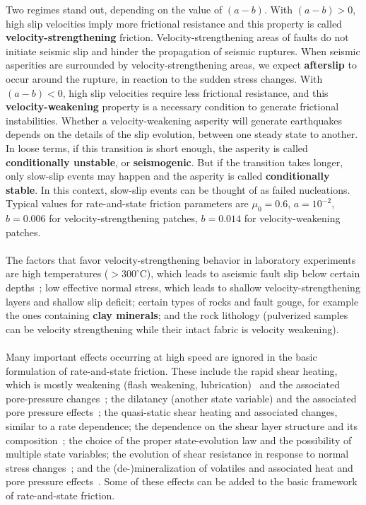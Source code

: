 \documentclass[letterpaper,12pt,]{memoir}
\begin{document}
Two regimes stand out, depending on the value of $(a-b)$. With $(a-b)>0$, high slip velocities imply more frictional resistance and this property is called \textbf{velocity-strengthening} friction. Velocity-strengthening areas of faults do not initiate seismic slip and hinder the propagation of seismic ruptures. When seismic asperities are surrounded by velocity-strengthening areas, we expect \textbf{afterslip} to occur around the rupture, in reaction to the sudden stress changes. With $(a-b)<0$, high slip velocities require less frictional resistance, and this \textbf{velocity-weakening} property is a necessary condition to generate frictional instabilities. Whether a velocity-weakening asperity will generate earthquakes depends on the details of the slip evolution, between one steady state to another. In loose terms, if this transition is short enough, the asperity is called \textbf{conditionally unstable}, or \textbf{seismogenic}. But if the transition takes longer, only slow-slip events may happen and the asperity is called \textbf{conditionally stable}. In this context, slow-slip events can be thought of as failed nucleations. Typical values for rate-and-state friction parameters are $\mu_0=0.6$, $a=10^{-2}$, $b=0.006$ for velocity-strengthening patches, $b=0.014$ for velocity-weakening patches.\\
\\
The factors that favor velocity-strengthening behavior in laboratory experiments are high temperatures ($>300^\circ$C), which leads to aseismic fault slip below certain depths~\citep{tse&rice86}; low effective normal stress, which leads to shallow velocity-strengthening layers and shallow slip deficit; certain types of rocks and fault gouge, for example the ones containing \textbf{clay minerals}; and the rock lithology (pulverized samples can be velocity strengthening while their intact fabric is velocity weakening).\\
\\
Many important effects occurring at high speed are ignored in the basic formulation of rate-and-state friction. These include the rapid shear heating, which is mostly weakening (flash weakening, lubrication)~\citep{tsutsumi&shimamoto97,ditoro+04,ditoro+06,ferri+10} and the associated pore-pressure changes~\citep{sibson73,bizzarri&cocco06a,noda&lapusta10,urata&kuge12}; the dilatancy (another state variable) and the associated pore pressure effects~\citep{segall&rice95,samuelson+11}; the quasi-static shear heating and associated changes, similar to a rate dependence; the dependence on the shear layer structure and its composition~\citep{santamarina&shin09,andrade+12}; the choice of the proper state-evolution law and the possibility of multiple state variables; the evolution of shear resistance in response to normal stress changes~\citep{linker&dieterich92}; and the (de-)mineralization of volatiles and associated heat and pore pressure effects~\citep{sulem&famin09}. Some of these effects can be added to the basic framework of rate-and-state friction.
\end{document}
